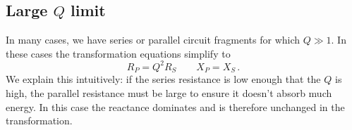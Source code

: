 \subsection{Large $Q$ limit}

In many cases, we have series or parallel circuit fragments for which $Q \gg 1$.
In these cases the transformation equations simplify to \begin{equation}
R_P = Q^2 R_S \qquad X_P = X_S \, . \end{equation}
We explain this intuitively: if the series resistance is low enough that the $Q$ is high, the parallel resistance must be large to ensure it doesn't absorb much energy.
In this case the reactance dominates and is therefore unchanged in the transformation.
